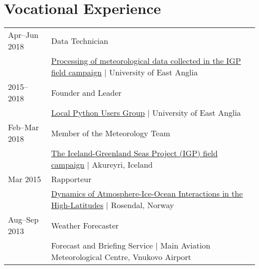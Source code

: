 \documentclass[a4paper, 11pt]{article}
\begin{document}
\section{Vocational Experience}
\begin{tabularx}{\linewidth}{@{}l X@{}}
Apr--Jun 2018 & Data Technician \\ & \href{https://github.com/IGPResearch}{Processing of meteorological data collected in the IGP field campaign} | University of East Anglia \\
2015--2018 & Founder and Leader \\ & \href{https://ueapy.github.io/}{Local Python Users Group} | University of East Anglia \\
Feb--Mar 2018 & Member of the Meteorology Team \\ & \href{https://twitter.com/igpresearch}{The Iceland-Greenland Seas Project (IGP) field campaign} | Akureyri, Iceland \\
Mar 2015 & Rapporteur \\ & \href{https://highlatdynamics.w.uib.no}{Dynamics of Atmosphere-Ice-Ocean Interactions in the High-Latitudes} | Rosendal, Norway \\
Aug--Sep 2013 & Weather Forecaster \\ & Forecast and Briefing Service | Main Aviation Meteorological Centre, Vnukovo Airport \\
\end{tabularx}

\end{document}
